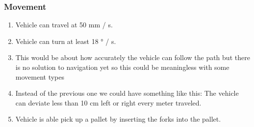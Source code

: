 \documentclass{article}
\begin{document}
        \subsubsection{Movement}
           \begin{center}
                \begin{enumerate}
                    \item Vehicle can travel at 50 mm / s.
                    \item Vehicle can turn at least 18 ° / s. %
                    \item This would be about how accurately the vehicle can follow the path but there is no solution to navigation yet so this could be meaningless with some movement types
                    \item Instead of the previous one we could have something like this: The vehicle can deviate less than 10 cm left or right every meter traveled.
                    \item Vehicle is able pick up a pallet by inserting the forks into the pallet. %
                \end{enumerate}
            \end{center}
\end{document}
